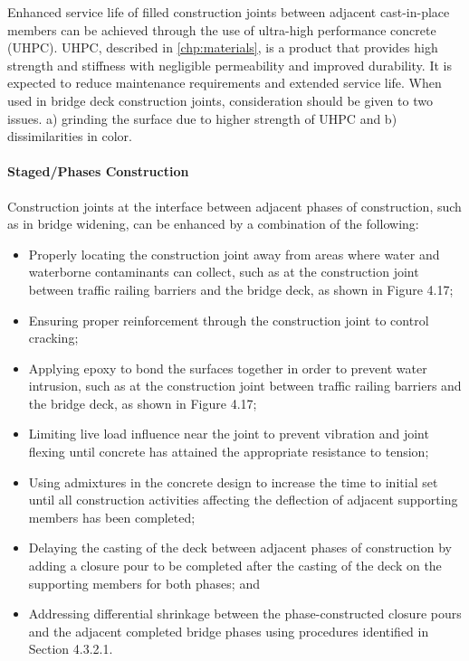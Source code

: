 Enhanced service life of filled construction joints between adjacent cast-in-place members can be achieved
through the use of ultra-high performance concrete (UHPC). UHPC, described in \cref{chp:materials}, is a product that
provides high strength and stiffness with negligible permeability and improved durability. It is expected to reduce
maintenance requirements and extended service life. When used in bridge deck construction joints, consideration
should be given to two issues. a) grinding the surface due to higher strength of UHPC and b) dissimilarities in color.

\paragraph{Staged/Phases Construction}
Construction joints at the interface between adjacent phases of construction, such as in bridge widening, can be
enhanced by a combination of the following:
\begin{itemize}
  \item Properly locating the construction joint away from areas where water and waterborne contaminants can
  collect, such as at the construction joint between traffic railing barriers and the bridge deck, as shown in
  Figure 4.17;
  \item Ensuring proper reinforcement through the construction joint to control cracking;
  \item Applying epoxy to bond the surfaces together in order to prevent water intrusion, such as at the construction
  joint between traffic railing barriers and the bridge deck, as shown in Figure 4.17;
  \item Limiting live load influence near the joint to prevent vibration and joint flexing until concrete has attained
  the appropriate resistance to tension;
  \item Using admixtures in the concrete design to increase the time to initial set until all construction activities
  affecting the deflection of adjacent supporting members has been completed;
  \item Delaying the casting of the deck between adjacent phases of construction by adding a closure pour to be
  completed after the casting of the deck on the supporting members for both phases; and
  \item Addressing differential shrinkage between the phase-constructed closure pours and the adjacent completed
  bridge phases using procedures identified in Section 4.3.2.1.
\end{itemize}


